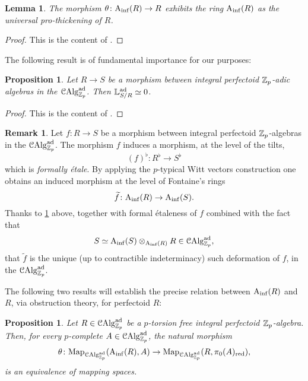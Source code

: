 \documentclass[10pt,a4paper]{amsart}
\numberwithin{equation}{subsection}
\newtheorem{lemma}[theorem]{Lemma}
\newtheorem{proposition}[theorem]{Proposition}
\theoremstyle{definition}
\newtheorem{remark}[theorem]{Remark}
\begin{document}
\begin{lemma} \label{pro_thick}
    The morphism $\theta \colon \mathrm{A}_{\mathrm{inf}}(R) \to R$ exhibits the ring $\mathrm{A}_{\mathrm{inf}}(R)$ as the universal pro-thickening of $R$.
\end{lemma}

\begin{proof}
    This is the content of \cite[Proposition 3.14]{szamuely2016p}. 
\end{proof}

The following result is of fundamental importance for our purposes:

\begin{proposition} \label{prop_non_obs_perf}
    Let $R \to S$ be a morphism between integral perfectoid $\mathbb Z_p$-adic algebras in the \infcat $\mathcal C \mathrm{Alg}^{\mathrm{ad}}_{\mathbb Z_p}$. Then $\mathbb{L}^{\mathrm{ad}}_{S/R} \simeq 0$.
\end{proposition}

\begin{proof}
    This is the content of \cite[Proposition 3.14]{bhatt2018integral}.
\end{proof}

\begin{remark}
    Let $f \colon R \to S$ be a morphism between integral perfectoid $\mathbb Z_p$-algebras in the \infcat $\mathcal C \mathrm{Alg}^{\mathrm{ad}}_{\mathbb Z_p}$. The morphism $f$ induces a morphism, at the level of the tilts,
        \[
            (f)^\flat \colon R^\flat \to S^\flat  
        \]
    which is \emph{formally \'etale}. By applying the $p$-typical Witt vectors construction one obtains an induced morphism at the level of Fontaine's rings
        \[
            \widetilde{f} \colon \mathrm{A}_{\mathrm{inf}}(R) \to \mathrm{A}_{\mathrm{inf}}(S). 
        \]
    Thanks to \cref{pro_thick} above,
    \cite[Proposition 8.4.2.5, see also Remark 8.4.2.3]{Lurie_Higher_algebra} together with formal \'etaleness of $f$ combined with the fact that 
        \[
            S \simeq  \mathrm{A}_{\mathrm{inf}}(S) \otimes_{\mathrm{A}_{\mathrm{inf}}(R)} R \in \mathcal C \mathrm{Alg}^{\mathrm{ad}}_{\mathbb Z_p},
        \]
    that $\widetilde{f}$ is the unique (up to contractible indeterminacy) such deformation of $f$, in the \infcat $\mathcal C \mathrm{Alg}^{\mathrm{ad}}_{\mathbb Z_p}$.
\end{remark}


The following two results will establish the precise relation between $\mathrm{A}_{\mathrm{inf}}(R) $ and $R$, via obstruction theory, for perfectoid $R$:



\begin{proposition} \label{Ainf_de_Rham}
    Let $R \in \mathcal C \mathrm{Alg}^{\mathrm{ad}}_{\mathbb Z_p}$ be a $p$-torsion free integral perfectoid $\mathbb Z_p$-algebra. Then, for every $p$-complete $A \in \mathcal C \mathrm{Alg}^{\mathrm{ad}}_{\mathbb Z_p}$, the natural morphism
        \[
               \theta \colon \mathrm{Map}_{\mathcal C \mathrm{Alg}^{\mathrm{ad}}_{\mathbb Z_p}}(\mathrm{A}_{\mathrm{inf}}(R), A) \to   \mathrm{Map}_{\mathcal C \mathrm{Alg}^{\mathrm{ad}}_{\mathbb Z_p}}(R, \pi_0(A)_\mathrm{red}) ,
        \]
    is an equivalence of mapping spaces.
\end{proposition}
\end{document}
